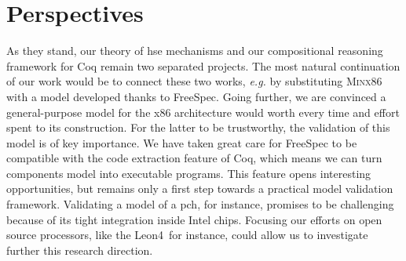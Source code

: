 \section{Perspectives}
\label{sec:conclusion:perspectives}

As they stand, our theory of \ac{hse} mechanisms and our compositional reasoning
framework for Coq remain two separated projects.
%
The most natural continuation of our work would be to connect these two works,
\emph{e.g.} by substituting {\scshape Minx86} with a model developed thanks to
FreeSpec.
%
Going further, we are convinced a general-purpose model for the x86 architecture
would worth every time and effort spent to its construction.
%
For the latter to be trustworthy, the validation of this model is of key
importance.
%
We have taken great care for FreeSpec to be compatible with the code extraction
feature of Coq, which means we can turn components model into executable
programs.
%
This feature opens interesting opportunities, but remains only a first step
towards a practical model validation framework.
%
Validating a model of a \ac{pch}, for instance, promises to be challenging
because of its tight integration inside Intel chips.
%
Focusing our efforts on open source processors, like the
Leon4\,\cite{gaisler2007leon} for instance, could allow us to investigate
further this research direction.
